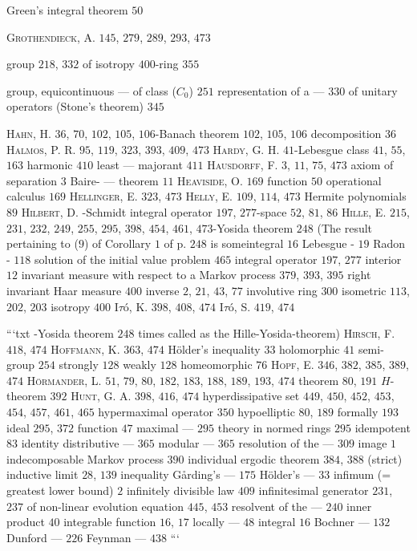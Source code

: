 Green's integral theorem $50$

\textsc{Grothendieck}, A. $145$, $279$, $289$, $293$, $473$

group $218$, $332$ of isotropy $400$-ring $355$

group, equicontinuous --- of class ($C_0$) $251$ representation of a --- $330$ of unitary operators (Stone's theorem) $345$ 

\textsc{Hahn}, H. $36$, $70$, $102$, $105$, $106$-Banach theorem $102$, $105$, $106$ decomposition $36$ \textsc{Halmos}, P. R. $95$, $119$, $323$, $393$, $409$, $473$ \textsc{Hardy}, G. H. $41$-Lebesgue class $41$, $55$, $163$ harmonic $410$ least --- majorant $411$ \textsc{Hausdorff}, F. $3$, $11$, $75$, $473$ axiom of separation $3$ Baire- --- theorem $11$ \textsc{Heaviside}, O. $169$ function $50$ operational calculus $169$ \textsc{Hellinger}, E. $323$, $473$ \textsc{Helly}, E. $109$, $114$, $473$ Hermite polynomials $89$ \textsc{Hilbert}, D. -Schmidt integral operator $197$, $277$-space $52$, $81$, $86$ \textsc{Hille}, E. $215$, $231$, $232$, $249$, $255$, $295$, $398$, $454$, $461$, $473$-Yosida theorem $248$ (The result pertaining to ($9$) of Corollary $1$ of p. $248$ is someintegral $16$ Lebesgue - $19$ Radon - $118$ solution of the initial value problem $465$ integral operator $197$, $277$ interior $12$ invariant measure with respect to a Markov process $379$, $393$, $395$ right invariant Haar measure $400$ inverse $2$, $21$, $43$, $77$ involutive ring $300$ isometric $113$, $202$, $203$ isotropy $400$ I$\tau$\'{o}, K. $398$, $408$, $474$ I$\tau$\'{o}, S. $419$, $474$ 

```txt -Yosida theorem $248$ times called as the Hille-Yosida-theorem) \textsc{Hirsch}, F. $418$, $474$ \textsc{Hoffmann}, K. $363$, $474$ Hölder's inequality $33$ holomorphic $41$ semi-group $254$ strongly $128$ weakly $128$ homeomorphic $76$ \textsc{Hopf}, E. $346$, $382$, $385$, $389$, $474$ \textsc{Hörmander}, L. $51$, $79$, $80$, $182$, $183$, $188$, $189$, $193$, $474$ theorem $80$, $191$ $H$-theorem $392$ \textsc{Hunt}, G. A. $398$, $416$, $474$ hyperdissipative set $449$, $450$, $452$, $453$, $454$, $457$, $461$, $465$ hypermaximal operator $350$ hypoelliptic $80$, $189$ formally $193$ ideal $295$, $372$ function $47$ maximal --- $295$ theory in normed rings $295$ idempotent $83$ identity distributive --- $365$ modular --- $365$ resolution of the --- $309$ image $1$ indecomposable Markov process $390$ individual ergodic theorem $384$, $388$ (strict) inductive limit $28$, $139$ inequality Gårding's --- $175$ Hölder's --- $33$ infimum (= greatest lower bound) $2$ infinitely divisible law $409$ infinitesimal generator $231$, $237$ of non-linear evolution equation $445$, $453$ resolvent of the --- $240$ inner product $40$ integrable function $16$, $17$ locally --- $48$ integral $16$ Bochner --- $132$ Dunford --- $226$ Feynman --- $438$ ```

